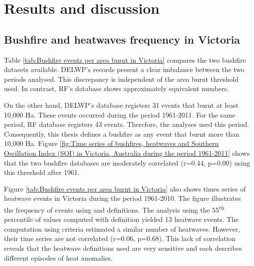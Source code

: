 \section{Results and discussion}


\subsection{Bushfire and heatwaves frequency in Victoria}

Table \ref{tab:Bushfire events per area burnt in Victoria} compares
the two bushfire datasets available. DELWP's records present a clear
imbalance between the two periods analysed. This discrepancy is
independent of the area burnt threshold used. In contrast, RF's database
shows approximately equivalent numbers.

On the other hand, DELWP's database registers 31 events that burnt
at least 10,000 Ha. These events occurred during the period 1961-2011.
For the same period, RF database registers 43 events. Therefore, the
analyses used this period. Consequently, this thesis defines a bushfire
as any event that burnt more than 10,000 Ha. Figure \ref{fig:Time series of bushfires, heatwaves and Southern Oscillation Index (SOI) in Victoria, Australia during the period 1961-2011}
shows that the two bushfire databases are moderately correlated (r=0.44,
p=0.00) using this threshold after 1961.

\begin{table}[h]
\caption[Bushfire events per area burnt in Victoria]{Bushfire events per area burnt in Victoria during the season December-January-February
(DJF). Data source: Department of Environment, Land, Water and Planning
(DELWP) and Risk Frontiers (RF). \label{tab:Bushfire events per area burnt in Victoria}}


\noindent \centering{}\noindent{}
\end{table}


Figure \ref{tab:Bushfire events per area burnt in Victoria} also
shows times series of heatwave events in Victoria during the period
1961-2010. The figure illustrates the frequency of events using \citet{Nairn2009}
and \citet{Pezza2012} definitions. The analysis using the 55\textsuperscript{th} percentile
of values computed with \citet{Nairn2009} definition yielded 13 heatwave
events. The computation using \citet{Pezza2012} criteria estimated
a similar number of heatwaves. However, their time series are not correlated (r=0.06, p=0.68).
This lack of correlation reveals that the heatwave definitions used are very sensitive and 
each describes different episodes of heat anomalies.  

